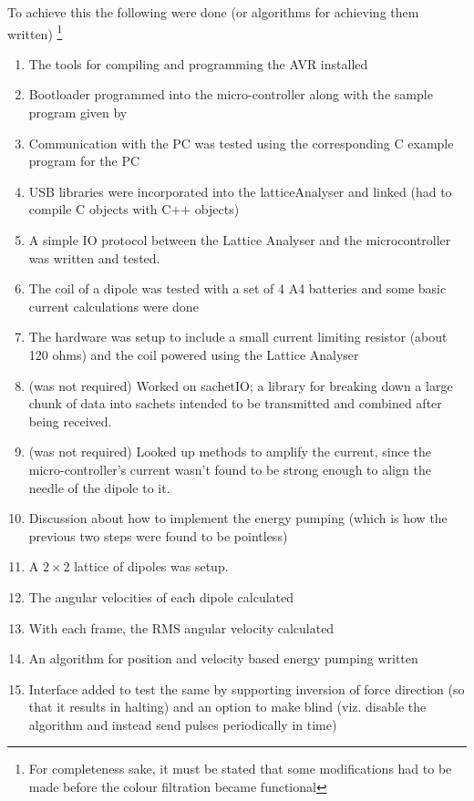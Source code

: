 		\par
		To achieve this the following were done (or algorithms for achieving them written) \footnote{For completeness sake, it must be stated that some modifications had to be made before the colour filtration became functional}
		\begin{enumerate}
			\item The tools for compiling and programming the AVR installed
			\item Bootloader programmed into the micro-controller along with the sample program given by \myProf
			\item Communication with the PC was tested using the corresponding C example program for the PC
			\item USB libraries were incorporated into the latticeAnalyser and linked (had to compile C objects with C++ objects)
			\item A simple IO protocol between the Lattice Analyser and the microcontroller was written and tested.
			\item The coil of a dipole was tested with a set of 4 A4 batteries and some basic current calculations were done
			\item The hardware was setup to include a small current limiting resistor (about 120 ohms) and the coil powered using the Lattice Analyser
			\item (was not required) Worked on sachetIO; a library for breaking down a large chunk of data into sachets intended to be transmitted and combined after being received.
			\item (was not required) Looked up methods to amplify the current, since the micro-controller's current wasn't found to be strong enough to align the needle of the dipole to it.
			\item Discussion about how to implement the energy pumping (which is how the previous two steps were found to be pointless)
			\item A $2 \times 2$ lattice of dipoles was setup. 
			\item The angular velocities of each dipole calculated
			\item With each frame, the RMS angular velocity calculated
			\item An algorithm for position and velocity based energy pumping written
			\item Interface added to test the same by supporting inversion of force direction (so that it results in halting) and an option to make blind (viz. disable the algorithm and instead send pulses periodically in time)
		\end{enumerate}
